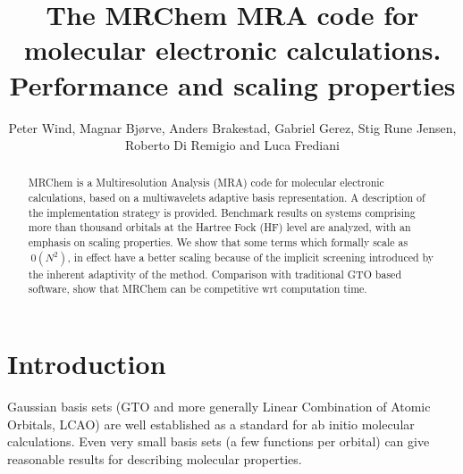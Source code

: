 \documentclass{article}
\begin{document}


\title{The MRChem MRA code for molecular electronic calculations. Performance and scaling properties}

\author{Peter Wind, Magnar Bjørve, Anders Brakestad, Gabriel Gerez, Stig Rune Jensen, Roberto Di Remigio and Luca Frediani}


\maketitle

\begin{abstract}
MRChem is a Multiresolution Analysis (MRA) code for molecular electronic calculations, based on a multiwavelets adaptive basis representation. A description of the implementation strategy is provided. Benchmark results on systems comprising more than thousand orbitals at the Hartree Fock (HF) level are analyzed, with an emphasis on scaling properties. 
We show that some terms which formally scale as $~0(N^2)$, in effect have a better scaling because of the implicit screening introduced by the inherent adaptivity of the method. Comparison with traditional GTO based software, show that MRChem can be competitive wrt computation time.

\end{abstract}


\section{Introduction}


Gaussian basis sets (GTO and more generally Linear Combination of Atomic Orbitals, LCAO) are well established as a standard for ab initio molecular calculations. 
Even very small basis sets (a few functions per orbital) can give reasonable results for describing molecular properties. 

\end{document}
